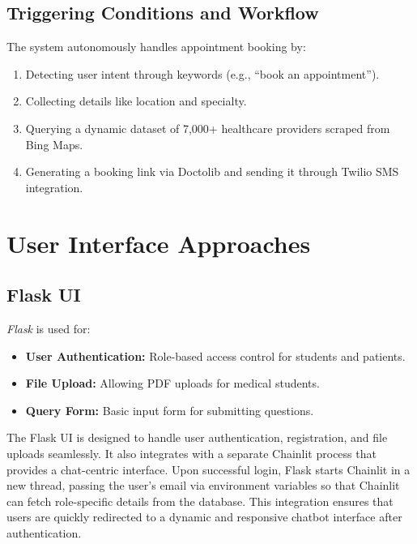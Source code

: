 \subsection{Triggering Conditions and Workflow}
\label{subsec:booking_workflow}
The system autonomously handles appointment booking by:
\begin{enumerate}
    \item Detecting user intent through keywords (e.g., “book an appointment”).
    \item Collecting details like location and specialty.
    \item Querying a dynamic dataset of 7,000+ healthcare providers scraped from Bing Maps.
    \item Generating a booking link via Doctolib and sending it through Twilio SMS integration.
\end{enumerate}

\section{User Interface Approaches}
\label{sec:user_interface}

\subsection{Flask UI}
\label{subsec:flask_ui}
\emph{Flask} is used for:
\begin{itemize}[itemsep=2em]
    \item \textbf{User Authentication:} Role-based access control for students and patients.
    \item \textbf{File Upload:} Allowing PDF uploads for medical students.
    \item \textbf{Query Form:} Basic input form for submitting questions.
\end{itemize}

The Flask UI is designed to handle user authentication, registration, and file uploads seamlessly. It also integrates with a separate Chainlit process that provides a chat-centric interface. Upon successful login, Flask starts Chainlit in a new thread, passing the user's email via environment variables so that Chainlit can fetch role-specific details from the database. This integration ensures that users are quickly redirected to a dynamic and responsive chatbot interface after authentication.

